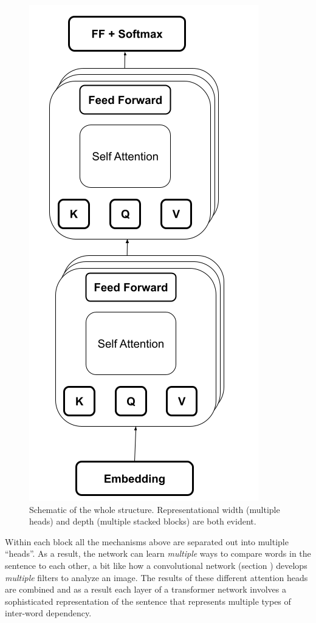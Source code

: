 \begin{figure}[h]
\centering
\includegraphics[scale=.45]{./images/transformerArchitectureSchematic.png}
\caption[Jeff Yoshimi with consultation from Tim Meyer.]{Schematic of the whole structure. Representational width (multiple heads) and depth (multiple stacked blocks) are both evident.}
\label{transformerArchitectureSchematic}
\end{figure}

Within each block all the mechanisms above are separated out into multiple ``heads''. As a result, the network can learn \emph{multiple} ways to compare words in the sentence to each other, a bit like how a convolutional network (section ) develops \emph{multiple} filters to analyze an image.  The results of these different attention heads are combined and as a result each layer of a transformer network involves a sophisticated representation of the sentence that represents multiple types of inter-word dependency.
 
